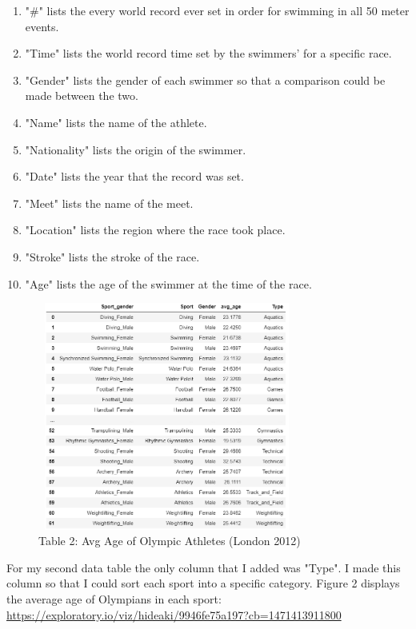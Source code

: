 \documentclass[letterpaper, 10 pt, conference]{ieeeconf}  %
\begin{document}

 \begin{enumerate}
	\item  "\#" lists the every world record ever set in order for swimming in all 50 meter events.
    \item "Time" lists the world record time set by the swimmers' for a specific race.
    \item "Gender" lists the gender of each swimmer so that a comparison could be made between the two.
    \item "Name" lists the name of the athlete.
    \item "Nationality" lists the origin  of the swimmer.
    \item "Date" lists the year that the record was set.
    \item "Meet" lists the name of the meet. 
    \item "Location" lists the region where the race took place.
    \item "Stroke" lists the stroke of the race.
    \item "Age" lists the age of the swimmer at the time of the race. 
\end{enumerate}

\begin{figure}
    \centering
    \includegraphics[width=8.5cm, height=7.5cm]{Avg_Age_of_Olympic_Athletes}
    \caption{Table 2: Avg Age of Olympic Athletes (London 2012)}
    \label{Fig 2}
\end{figure}

 For my second data table the only column that I added was "Type". I made this column so that I could sort each sport into a specific category. Figure 2 displays the average age of Olympians in each sport: \url{https://exploratory.io/viz/hideaki/9946fe75a197?cb=1471413911800}
 
\end{document}
